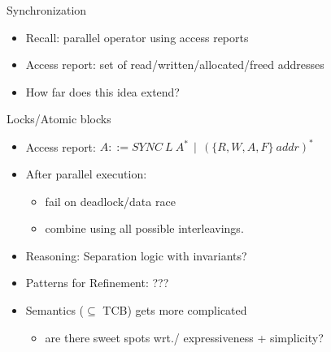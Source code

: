 \documentclass[fleqn]{beamer}
\begin{document}
\begin{frame}{Synchronization}
  \begin{itemize}
   \item Recall: parallel operator using access reports

  \end{itemize}

  \begin{itemize}
   \item Access report: set of read/written/allocated/freed addresses
   \item How far does this idea extend?


  \end{itemize}
\end{frame}
\begin{frame}{Locks/Atomic blocks}
  \begin{itemize}
   \item Access report: $A ::= SYNC~L~A^*~~|~~(\{R,W,A,F\}~addr)^*$
   \item After parallel execution:
    \begin{itemize}
     \item fail on deadlock/data race
     \item combine using all possible interleavings.
    \end{itemize}
   \item Reasoning: Separation logic with invariants?
   \item Patterns for Refinement: ???
   \item Semantics ($\subseteq$ TCB) gets more complicated
    \begin{itemize}
     \item are there sweet spots wrt./ expressiveness + simplicity?


    \end{itemize}
  \end{itemize}
\end{frame}
\end{document}
